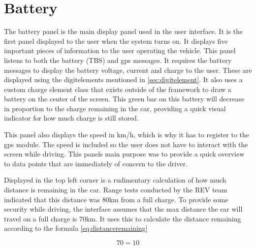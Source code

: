 

\section{Battery}

The battery panel is the main display panel used in the user interface. It is the first panel displayed to the user when the system turns on.  It displays five important pieces of information to the user operating the vehicle. This panel listens to both the battery (TBS) and gps messages. It requires the battery messages to display the battery voltage, current and charge to the user. These are displayed using the digitelements mentioned in \ref{sec:digitelement}. It also uses a custom charge element class that exists outside of the framework to draw a battery on the center of the screen. This green bar on this battery will decrease in proportion to the charge remaining in the car, providing a quick visual indicator for how much charge is still stored. 

This panel also displays the speed in km/h, which is why it has to register to the gps module. The speed is included so the user does not have to interact with the screen while driving. This panels main purpose was to provide a quick overview to data points that are immediately of concern to the driver. 

Displayed in the top left corner is a rudimentary calculation of how much distance is remaining in the car. Range tests conducted by the REV team indicated that this distance was 80km from a full charge. To provide some security while driving, the interface assumes that the max distance the car will travel on a full charge is 70km. It uses this to calculate the distance remaining according to the formula \ref{eq:distanceremaining}

\begin{equation}
\label{eq:distanceremaining}
70=10
\end{equation}





